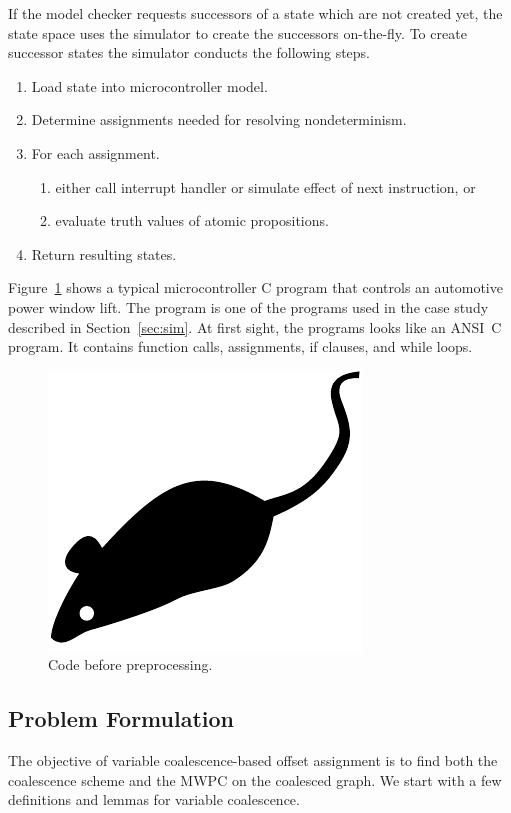 \documentclass[prodmode,acmtecs]{acmsmall}
\begin{document}
If the model checker requests successors of a state which are not
created yet, the state space uses the simulator to create the
successors on-the-fly. To create successor states the simulator
conducts the following steps.
\begin{enumerate}
\item Load state into microcontroller model.
\item Determine assignments needed for resolving nondeterminism.
\item For each assignment.
      \begin{enumerate}
      \item either call interrupt handler or simulate effect of next instruction, or
      \item evaluate truth values of atomic propositions.
      \end{enumerate}
\item Return resulting states.
\end{enumerate}
Figure~\ref{fig:one} shows a typical microcontroller C program that
controls an automotive power window lift. The program is one of the
programs used in the case study described in Section~\ref{sec:sim}.
At first sight, the programs looks like an ANSI~C program. It
contains function calls, assignments, if clauses, and while loops.
\begin{figure}
\centerline{\includegraphics{acmsmall-mouse}}
\caption{Code before preprocessing.}
\label{fig:one}
\end{figure}

\subsection{Problem Formulation}

The objective of variable coalescence-based offset assignment is to find
both the coalescence scheme and the MWPC on the coalesced graph. We start
with a few definitions and lemmas for variable coalescence.
\end{document}

